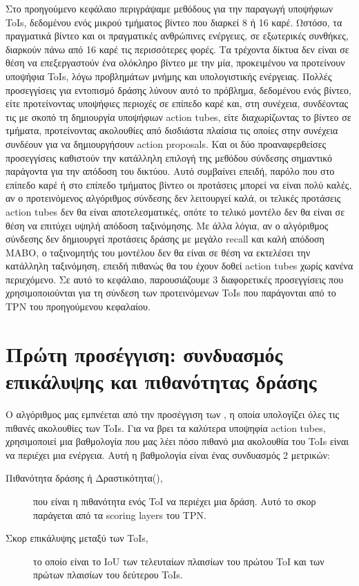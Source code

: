 Στο προηγούμενο κεφάλαιο περιγράψαμε μεθόδους για την παραγωγή υποψήφιων \en ToIs\gr, δεδομένου ενός μικρού τμήματος βίντεο που διαρκεί 8 ή 16 καρέ. Ωστόσο, τα πραγματικά βίντεο και οι πραγματικές ανθρώπινες ενέργειες, σε εξωτερικές συνθήκες, διαρκούν πάνω από 16 καρέ τις περισσότερες φορές. Τα τρέχοντα δίκτυα δεν είναι σε θέση να επεξεργαστούν ένα ολόκληρο βίντεο με την μία, προκειμένου να προτείνουν υποψήφια \en ToIs\gr,
λόγω προβλημάτων μνήμης και υπολογιστικής ενέργειας.
Πολλές προσεγγίσεις για εντοπισμό δράσης λύνουν αυτό το πρόβλημα, δεδομένου ενός βίντεο, είτε 
προτείνοντας υποψήφιες περιοχές σε επίπεδο καρέ και, στη συνέχεια,  συνδέοντας τις με σκοπό τη δημιουργία υποψήφιων \en action tubes\gr, είτε
 διαχωρίζωντας το βίντεο  σε τμήματα, προτείνοντας ακολουθίες από δισδιάστα πλαίσια τις οποίες στην συνέχεια συνδέουν για να δημιουργήσουν
\en action proposals\gr.
Και οι δύο προαναφερθείσες προσεγγίσεις καθιστούν την κατάλληλη επιλογή της μεθόδου σύνδεσης σημαντικό παράγοντα για την απόδοση του δικτύου.
Αυτό συμβαίνει επειδή, παρόλο που στο επίπεδο καρέ ή στο επίπεδο τμήματος βίντεο
οι προτάσεις μπορεί να είναι πολύ καλές, αν ο προτεινόμενος αλγόριθμος σύνδεσης δεν λειτουργεί καλά, οι τελικές προτάσεις \en action tubes \gr
δεν θα είναι αποτελεσματικές, οπότε το τελικό μοντέλο δεν θα
είναι σε θέση να επιτύχει υψηλή απόδοση ταξινόμησης.
Με άλλα λόγια, αν ο αλγόριθμος σύνδεσης δεν δημιουργεί προτάσεις δράσης με μεγάλο \en recall \gr και καλή απόδοση \en MABO\gr,
ο ταξινομητής του μοντέλου δεν θα είναι σε θέση να εκτελέσει την κατάλληλη ταξινόμηση, επειδή πιθανώς θα του έχουν δοθεί \en action tubes \gr χωρίς κανένα περιεχόμενο.
Σε αυτό το κεφάλαιο, παρουσιάζουμε 3 διαφορετικές προσεγγίσεις που χρησιμοποιούνται για τη σύνδεση των προτεινόμενων ToIs που παράγονται από το \en TPN \gr του προηγούμενου κεφαλαίου.

\section{Πρώτη προσέγγιση: συνδυασμός επικάλυψης και πιθανότητας δράσης}
Ο αλγόριθμος μας εμπνέεται από την προσέγγιση των \en\cite{DBLP:journals/corr/HouCS17}\gr, η οποία υπολογίζει όλες τις πιθανές ακολουθίες των \en ToIs\gr. Για να βρει τα  καλύτερα υποψηφία \en action tubes\gr,
χρησιμοποιεί μια βαθμολογία που μας λέει πόσο πιθανό μια ακολουθία του ToIs είναι να περιέχει μια ενέργεια. Αυτή η βαθμολογία είναι ένας συνδυασμός 2 μετρικών:
\begin{description}
\item[ Πιθανότητα δράσης ή Δραστικότητα(), ] που είναι η πιθανότητα ενός \en ToI \gr να περιέχει μια δράση. Αυτό το σκορ
  παράγεται από τα \en scoring layers \gr  του \en TPN\gr.
\item [Σκορ επικάλυψης μεταξύ των \en ToIs\gr, ] το οποίο είναι το \en IoU \gr των τελευταίων πλαισίων του πρώτου \en ToI \gr και των πρώτων πλαισίων του δεύτερου \en ToIs\gr.
\end{description}

